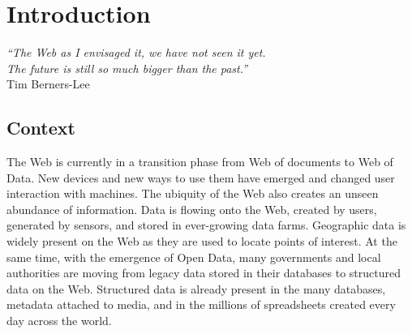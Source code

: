 \chapter{Introduction}
\label{intro}

\begin{flushright}
\textit{``The Web as I envisaged it, we have not seen it yet.\\
The future is still so much bigger than the past.''\\}
Tim Berners-Lee
\end{flushright}

\section{Context}
\label{sec:context}
The Web is currently in a transition phase from Web of documents to Web of Data. New devices and new ways to use them have emerged and changed user interaction with machines. The ubiquity of the Web also creates an unseen abundance of information. Data is flowing onto the Web, created by users, generated by sensors, and stored in ever-growing data farms. Geographic data is widely present on the Web as they are used to locate points of interest. At the same time, with the emergence of Open Data, many governments and local authorities are moving from legacy data stored in their databases to structured data on the Web. Structured data is already present in the many databases, metadata attached to media, and in the millions of spreadsheets created every day across the world.

